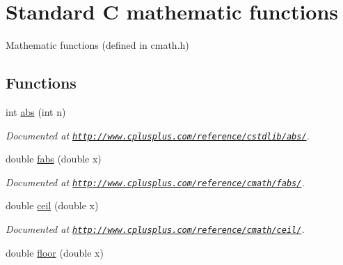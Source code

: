 \hypertarget{group__math}{\section{Standard C mathematic functions}
\label{group__math}
}


Mathematic functions (defined in cmath.\-h)  


\subsection*{Functions}
\begin{DoxyCompactItemize}
\item 
\hypertarget{group__math_gafd4f329c8efb45c0dfff44525047a0fa}{int \hyperlink{group__math_gafd4f329c8efb45c0dfff44525047a0fa}{abs} (int n)}\label{group__math_gafd4f329c8efb45c0dfff44525047a0fa}

\begin{DoxyCompactList}\small\item\em Documented at \href{http://www.cplusplus.com/reference/cstdlib/abs/}{\tt http\-://www.\-cplusplus.\-com/reference/cstdlib/abs/}. \end{DoxyCompactList}\item 
\hypertarget{group__math_ga8fb5c0b9b43a108724b355136d29d2f9}{double \hyperlink{group__math_ga8fb5c0b9b43a108724b355136d29d2f9}{fabs} (double x)}\label{group__math_ga8fb5c0b9b43a108724b355136d29d2f9}

\begin{DoxyCompactList}\small\item\em Documented at \href{http://www.cplusplus.com/reference/cmath/fabs/}{\tt http\-://www.\-cplusplus.\-com/reference/cmath/fabs/}. \end{DoxyCompactList}\item 
\hypertarget{group__math_ga1ea6d7b591132268abc2e843ababd084}{double \hyperlink{group__math_ga1ea6d7b591132268abc2e843ababd084}{ceil} (double x)}\label{group__math_ga1ea6d7b591132268abc2e843ababd084}

\begin{DoxyCompactList}\small\item\em Documented at \href{http://www.cplusplus.com/reference/cmath/ceil/}{\tt http\-://www.\-cplusplus.\-com/reference/cmath/ceil/}. \end{DoxyCompactList}\item 
\hypertarget{group__math_ga6de60a3e907dcf0bfe3ea8d64f1e8873}{double \hyperlink{group__math_ga6de60a3e907dcf0bfe3ea8d64f1e8873}{floor} (double x)}\label{group__math_ga6de60a3e907dcf0bfe3ea8d64f1e8873}


\end{DoxyCompactItemize}

